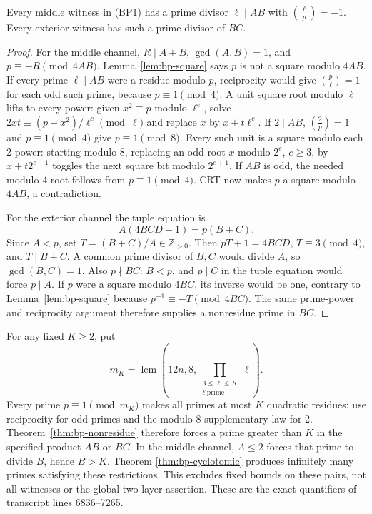 \begin{theorem}
\label{thm:bp-nonresidue}
Every middle witness in (BP1) has a prime divisor \(\ell\mid AB\)
with \(\left(\frac\ell p\right)=-1\). Every exterior witness
has such a prime divisor of \(BC\).
\end{theorem}
\begin{proof}
For the middle channel, \(R\mid A+B\), \(\gcd(A,B)=1\),
and \(p\equiv-R\pmod{4AB}\). Lemma~\ref{lem:bp-square}
says \(p\) is not a square modulo \(4AB\). If every prime
\(\ell\mid AB\) were a residue modulo \(p\), reciprocity
would give \(\left(\frac p\ell\right)=1\) for each odd
such prime, because \(p\equiv1\pmod4\). A unit square root
modulo \(\ell\) lifts to every power: given \(x^2\equiv p\)
modulo \(\ell^e\), solve
\(2xt\equiv(p-x^2)/\ell^e\pmod\ell\) and replace
\(x\) by \(x+t\ell^e\). If \(2\mid AB\),
\(\left(\frac2p\right)=1\) and \(p\equiv1\pmod4\)
give \(p\equiv1\pmod8\). Every such unit is a square modulo
each 2-power: starting modulo 8, replacing an odd root \(x\)
modulo \(2^e\), \(e\ge3\), by \(x+t2^{e-1}\) toggles
the next square bit modulo \(2^{e+1}\). If \(AB\) is odd,
the needed modulo-4 root follows from \(p\equiv1\pmod4\).
CRT now makes \(p\) a square modulo \(4AB\), a contradiction.

For the exterior channel the tuple equation is
\[
 A(4BCD-1)=p(B+C).
\]
Since \(A<p\), set \(T=(B+C)/A\in\mathbb Z_{>0}\).
Then \(pT+1=4BCD\), \(T\equiv3\pmod4\), and \(T\mid B+C\).
A common prime divisor of \(B,C\) would divide \(A\), so
\(\gcd(B,C)=1\). Also \(p\nmid BC\): \(B<p\), and
\(p\mid C\) in the tuple equation would force \(p\mid A\).
If \(p\) were a square modulo \(4BC\), its inverse would be
one, contrary to Lemma~\ref{lem:bp-square} because
\(p^{-1}\equiv-T\pmod{4BC}\). The same prime-power and
reciprocity argument therefore supplies a nonresidue prime in \(BC\).
\end{proof}

For any fixed \(K\ge2\), put
\[
 m_K=\operatorname{lcm}\left(12n,8,
       \prod_{\substack{3\le\ell\le K\\\ell\ \text{prime}}}\ell\right).
\]
Every prime \(p\equiv1\pmod{m_K}\) makes all primes at most
\(K\) quadratic residues: use reciprocity for odd primes and the
modulo-8 supplementary law for 2. Theorem~\ref{thm:bp-nonresidue}
therefore forces a prime greater than \(K\) in the specified product
\(AB\) or \(BC\). In the middle channel, \(A\le2\) forces
that prime to divide \(B\), hence \(B>K\). Theorem
\ref{thm:bp-cyclotomic} produces infinitely many primes satisfying
these restrictions. This excludes fixed bounds on these pairs, not
all witnesses or the global two-layer assertion. These are the exact
quantifiers of transcript lines 6836--7265.


